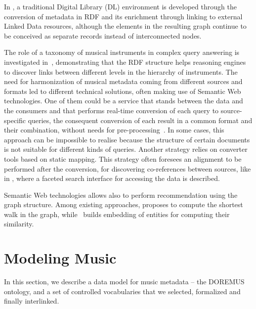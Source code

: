 In \cite{bainbridge2014greenstone}, a traditional Digital Library (DL) environment is developed through the conversion of metadata in RDF and its enrichment through linking to external Linked Data resources, although the elements in the resulting graph continue to be conceived as separate records instead of interconnected nodes.

The role of a taxonomy of musical instruments in complex query answering is investigated in~\cite{kolozali2011knowledge}, demonstrating that the RDF structure helps reasoning engines to discover links between different levels in the hierarchy of instruments. The need for harmonization of musical metadata coming from different sources and formats led to different technical solutions, often making use of Semantic Web technologies. One of them could be a service that stands between the data and the consumers and that performs real-time conversion of each query to source-specific queries, the consequent conversion of each result in a common format and their combination, without needs for pre-processing~\cite{lai2007metadata}. In some cases, this approach can be impossible to realise because the structure of certain documents is not suitable for different kinds of queries. Another strategy relies on converter tools based on static mapping. This strategy often foresees an alignment to be performed after the conversion, for discovering co-references between sources, like in \cite{bretherton2009integrating}, where a faceted search interface for accessing the data is described. 

Semantic Web technologies allows also to perform recommendation using the graph structure. Among existing approaches, \cite{braunhofer2013location} proposes to compute the shortest walk in the graph, while~\cite{rosati2016rdf} builds embedding of entities for computing their similarity.


\section{Modeling Music}\label{sec:model}
In this section, we describe a data model for music metadata -- the DOREMUS ontology, and a set of controlled vocabularies that we selected, formalized and finally interlinked.

